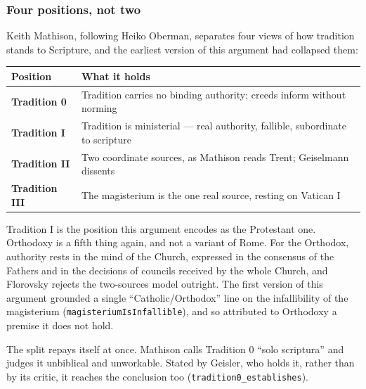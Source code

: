 \documentclass[11pt]{article}
\begin{document}
\subsubsection*{Four positions, not two}
Keith Mathison, following Heiko Oberman, separates four views of how tradition stands to Scripture, and the earliest version of this argument had collapsed them:

\begin{longtable}{@{}>{\raggedright\arraybackslash}p{} >{\raggedright\arraybackslash}p{}@{}}
\toprule
\textbf{Position} & \textbf{What it holds} \\
\midrule
\endhead
\textbf{Tradition 0} & Tradition carries no binding authority; creeds inform without norming \\
\textbf{Tradition I} & Tradition is ministerial — real authority, fallible, subordinate to scripture \\
\textbf{Tradition II} & Two coordinate sources, as Mathison reads Trent; Geiselmann dissents \\
\textbf{Tradition III} & The magisterium is the one real source, resting on Vatican I \\
\bottomrule
\end{longtable}
Tradition I is the position this argument encodes as the Protestant one. Orthodoxy is a fifth thing again, and not a variant of Rome. For the Orthodox, authority rests in the mind of the Church, expressed in the consensus of the Fathers and in the decisions of councils received by the whole Church, and Florovsky rejects the two-sources model outright. The first version of this argument grounded a single “Catholic/Orthodox” line on the infallibility of the magisterium (\texttt{magisterium\allowbreak{}Is\allowbreak{}Infallible}), and so attributed to Orthodoxy a premise it does not hold.

The split repays itself at once. Mathison calls Tradition 0 “solo scriptura” and judges it unbiblical and unworkable. Stated by Geisler, who holds it, rather than by its critic, it reaches the conclusion too (\texttt{tradition0\_\allowbreak{}establishes}).
\end{document}
